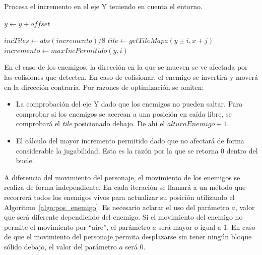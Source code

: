 \begin{algorithm}[h]
	\footnotesize
	\caption{Procesa el incremento en el eje Y teniendo en cuenta el entorno.}
	\label{algo:col_entorno_y}
	\DontPrintSemicolon %

	 {
		$y \gets y + offset$\;
	}

	$incTiles \gets abs(incremento) / 8$\;
	 {
		 {
			$tile \gets getTileMapa(y{\pm}i, x+j)$\;
			 {
				$incremento \gets maxIncPermitido(y,i)$\;
				\;
			}
		}
		}
		\;
\end{algorithm}
\FloatBarrier{}

En el caso de los enemigos, la dirección en la que se mueven se ve afectada por las colisiones que detecten. En caso de colisionar, el enemigo se invertirá y moverá en la dirección contraria. Por razones de optimización se omiten:

\begin{itemize}
	\item La comprobación del eje Y dado que los enemigos no pueden saltar. Para comprobar si los enemigos se acercan a una posición en caída libre, se comprobará el \textit{tile} posicionado debajo. De ahí el $alturaEnemigo+1$.
	\item El cálculo del mayor incremento permitido dado que no afectará de forma considerable la jugabilidad. Esta es la razón por la que se retorna 0 dentro del bucle.
\end{itemize}

A diferencia del movimiento del personaje, el movimiento de los enemigos se realiza de forma independiente. En cada iteración se llamará a un método que recorrerá todos los enemigos vivos para actualizar su posición utilizando el Algoritmo~\ref{algo:pos_enemigo}. Es necesario aclarar el uso del parámetro $a$, valor que será diferente dependiendo del enemigo. Si el movimiento del enemigo no permite el movimiento por ``aire'', el parámetro $a$ será mayor o igual a 1. En caso de que el movimiento del personaje permita desplazarse sin tener ningún bloque sólido debajo, el valor del parámetro $a$ será 0.

